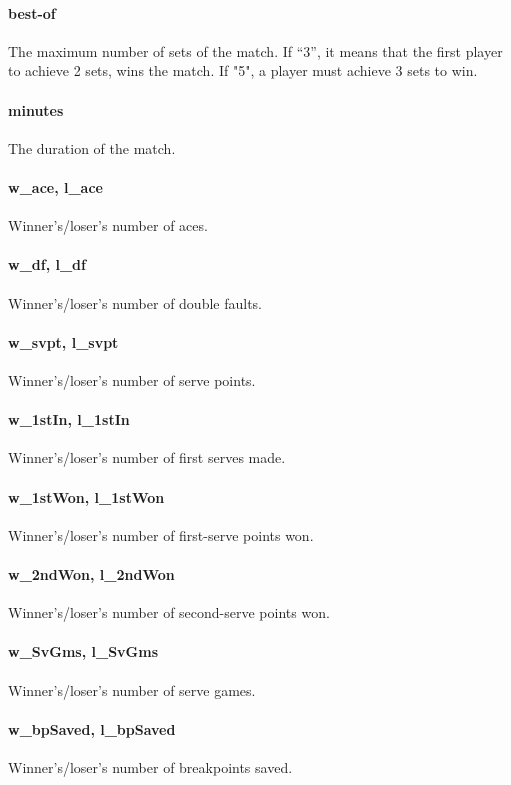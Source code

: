 \documentclass{article}
\begin{document}
\paragraph{best-of}
The maximum number of sets of the match. If “3”, it means that the first player to achieve 2 sets, wins the match. If "5", a player must achieve 3 sets to win.

\paragraph{minutes}
The duration of the match.

\paragraph{w\_ace, l\_ace}
Winner's/loser's number of aces.

\paragraph{w\_df, l\_df}
Winner's/loser's number of double faults.

\paragraph{w\_svpt, l\_svpt}
Winner's/loser's number of serve points.

\paragraph{w\_1stIn, l\_1stIn}
Winner's/loser's number of first serves made.

\paragraph{w\_1stWon, l\_1stWon}
Winner's/loser's number of first-serve points won.

\paragraph{w\_2ndWon, l\_2ndWon}
Winner's/loser's number of second-serve points won.

\paragraph{w\_SvGms, l\_SvGms}
Winner's/loser's number of serve games.

\paragraph{w\_bpSaved, l\_bpSaved}
Winner's/loser's number of breakpoints saved.
\end{document}
